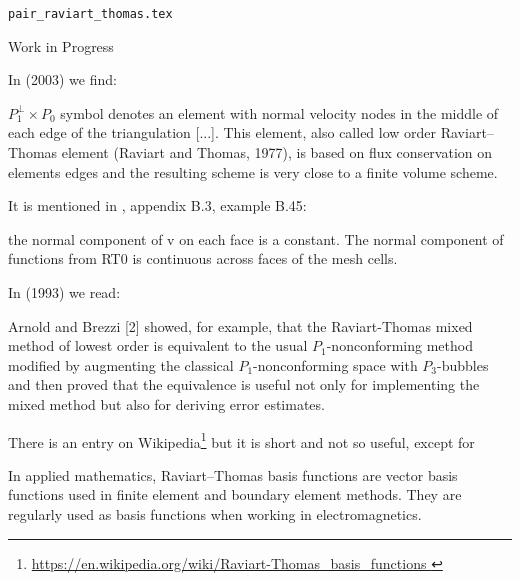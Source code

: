 \begin{flushright} {\tiny {\color{gray} \tt pair\_raviart\_thomas.tex}} \end{flushright}

{\color{orange} Work in Progress}
 
In \textcite{hald03} (2003) we find: 
\begin{displayquote}
{\color{darkgray}
$P_1^\perp \times P_0$ symbol denotes an element with 
normal velocity nodes in the middle of each edge of the
triangulation [...]. This element, also called low order Raviart–Thomas element 
(Raviart and Thomas, 1977), is based on flux conservation on elements edges and 
the resulting scheme is very close to a finite volume scheme.
}
\end{displayquote}

It is mentioned in \textcite{john16}, appendix B.3, example B.45: 
\begin{displayquote}
{\color{darkgray}
the normal component of v 
on each face is a constant. The normal component of functions from RT0 is
continuous across faces of the mesh cells.
}
\end{displayquote}


In \textcite{chen93a} (1993) we read:
\begin{displayquote}
{\color{darkgray}
Arnold and Brezzi [2] showed, for
example, that the Raviart-Thomas mixed method of lowest order is
equivalent to the usual $P_1$-nonconforming method modified by augmenting
the classical $P_1$-nonconforming space with $P_3$-bubbles and then proved that
the equivalence is useful not only for implementing the mixed method but
also for deriving error estimates.
}
\end{displayquote}


There is an entry on Wikipedia\footnote{\url{
https://en.wikipedia.org/wiki/Raviart-Thomas_basis_functions
}} but it is short and not so useful, except for
\begin{displayquote}
{\color{darkgray}
In applied mathematics, Raviart–Thomas basis functions are vector basis functions used 
in finite element and boundary element methods. They are regularly used as basis 
functions when working in electromagnetics. 
}
\end{displayquote}

